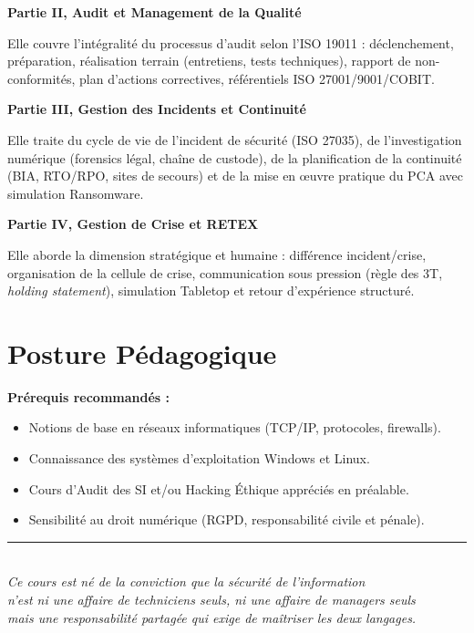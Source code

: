 \medskip
\noindent\textbf{Partie II, Audit et Management de la Qualité}

Elle couvre l'intégralité du processus d'audit selon l'ISO 19011 : déclenchement, préparation, réalisation terrain (entretiens, tests techniques), rapport de non-conformités, plan d'actions correctives, référentiels ISO 27001/9001/COBIT.

\medskip
\noindent\textbf{Partie III, Gestion des Incidents et Continuité}

Elle traite du cycle de vie de l'incident de sécurité (ISO 27035), de l'investigation numérique (forensics légal, chaîne de custode), de la planification de la continuité (BIA, RTO/RPO, sites de secours) et de la mise en œuvre pratique du PCA avec simulation Ransomware.

\medskip
\noindent\textbf{Partie IV, Gestion de Crise et RETEX}

Elle aborde la dimension stratégique et humaine : différence incident/crise, organisation de la cellule de crise, communication sous pression (règle des 3T, \textit{holding statement}), simulation Tabletop et retour d'expérience structuré.

\section*{Posture Pédagogique}

\begin{boxinfo}
\textbf{Prérequis recommandés :}
\begin{itemize}
    \item Notions de base en réseaux informatiques (TCP/IP, protocoles, firewalls).
    \item Connaissance des systèmes d'exploitation Windows et Linux.
    \item Cours d'Audit des SI et/ou Hacking Éthique appréciés en préalable.
    \item Sensibilité au droit numérique (RGPD, responsabilité civile et pénale).
\end{itemize}
\end{boxinfo}

\vspace{2ex}
\begin{center}
    {\color{CouleurAccent}\rule{0.6\linewidth}{1pt}}\\[0.8ex]
    {\small\itshape\color{CouleurPrimaire}
        Ce cours est né de la conviction que la sécurité de l'information\\
        n'est ni une affaire de techniciens seuls, ni une affaire de managers seuls\\
        mais une responsabilité partagée qui exige de maîtriser les deux langages.}\\[0.5ex]
    {\small\bfseries\color{CouleurPrimaire}\auteurcours}
\end{center}
